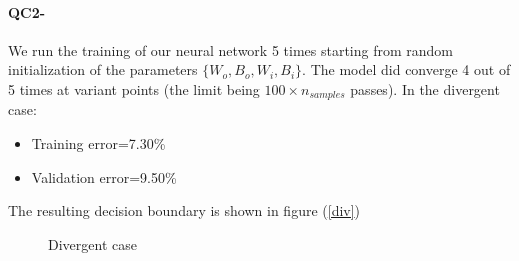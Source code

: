 \documentclass[11pt]{article}
\newcommand{\1}{\mathbbm{1}}
\newcommand{\0}{\mathbf{0}}
\begin{document}
	\paragraph{QC2-}
		We run the training of our neural network 5 times starting from random initialization of the parameters $\{W_o,B_o,W_i,B_i\}$.
		The model did converge 4 out of 5 times at variant points (the limit being $100\times n_{samples}$ passes). In the divergent case: 
		\begin{itemize}
		\item Training error=7.30\%
		\item Validation error=9.50\%
		\end{itemize}
		The resulting decision boundary is shown in figure (\ref{div})
		\begin{figure}[H]
			\centering
			\caption{Divergent case}
		\end{figure}
\end{document}
